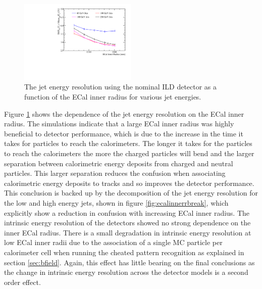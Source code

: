\begin{figure}
\includegraphics[width=0.5\textwidth]{OptimisationStudies/Plots/JetEnergyResolutions/JER_vs_ECalInnerRadius.pdf}
\caption[The jet energy resolution using the nominal ILD detector as a function of the ECal inner radius for various jet energies.]{The jet energy resolution using the nominal ILD detector as a function of the ECal inner radius for various jet energies.}
\label{fig:ecalinnerr}
\end{figure}

Figure \ref{fig:ecalinnerr} shows the dependence of the jet energy resolution on the ECal inner radius.  The simulations indicate that a large ECal inner radius was highly beneficial to detector performance, which is due to the increase in the time it takes for particles to reach the calorimeters.  The longer it takes for the particles to reach the calorimeters the more the charged particles will bend and the larger separation between calorimetric energy deposits from charged and neutral particles.  This larger separation reduces the confusion when associating calorimetric energy deposits to tracks and so improves the detector performance.  This conclusion is backed up by the decomposition of the jet energy resolution for the low and high energy jets, shown in figure \ref{fig:ecalinnerrbreak}, which explicitly show a reduction in confusion with increasing ECal inner radius.  The intrinsic energy resolution of the detectors showed no strong dependence on the inner ECal radius.  There is a small degradation in intrinsic energy resolution at low ECal inner radii due to the association of a single MC particle per calorimeter cell when running the cheated pattern recognition as explained in section \ref{sec:bfield}.  Again, this effect has little bearing on the final conclusions as the change in intrinsic energy resolution across the detector models is a second order effect.  

